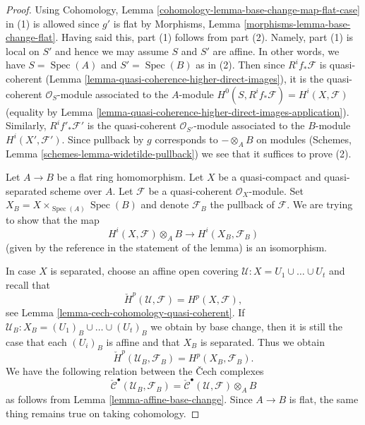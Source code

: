 \documentclass{stacks-project}
\theoremstyle{plain}
\theoremstyle{definition}
\theoremstyle{remark}
\numberwithin{equation}{subsection}
\def\Spec{\mathop{\mathrm{Spec}}}
\begin{document}
\begin{proof}
Using Cohomology, Lemma \ref{cohomology-lemma-base-change-map-flat-case} in (1)
is allowed since $g'$ is flat by
Morphisms, Lemma \ref{morphisms-lemma-base-change-flat}.
Having said this, part (1) follows from part (2). Namely,
part (1) is local on $S'$ and hence we may assume $S$
and $S'$ are affine. In other words, we have $S = \Spec(A)$
and $S' = \Spec(B)$ as in (2).
Then since $R^if_*\mathcal{F}$ is quasi-coherent
(Lemma \ref{lemma-quasi-coherence-higher-direct-images}),
it is the quasi-coherent $\mathcal{O}_S$-module associated to the
$A$-module $H^0(S, R^if_*\mathcal{F}) = H^i(X, \mathcal{F})$
(equality by
Lemma \ref{lemma-quasi-coherence-higher-direct-images-application}).
Similarly, $R^if'_*\mathcal{F}'$ is the quasi-coherent
$\mathcal{O}_{S'}$-module associated to the $B$-module
$H^i(X', \mathcal{F}')$. Since pullback by $g$ corresponds
to $- \otimes_A B$ on modules
(Schemes, Lemma \ref{schemes-lemma-widetilde-pullback})
we see that it suffices to prove (2).

\medskip\noindent
Let $A \to B$ be a flat ring homomorphism.
Let $X$ be a quasi-compact and quasi-separated scheme over $A$.
Let $\mathcal{F}$ be a quasi-coherent $\mathcal{O}_X$-module.
Set $X_B = X \times_{\Spec(A)} \Spec(B)$ and denote
$\mathcal{F}_B$ the pullback of $\mathcal{F}$.
We are trying to show that the map
$$
H^i(X, \mathcal{F}) \otimes_A B \longrightarrow H^i(X_B, \mathcal{F}_B)
$$
(given by the reference in the statement of the lemma)
is an isomorphism.

\medskip\noindent
In case $X$ is separated, choose an affine open covering
$\mathcal{U} : X = U_1 \cup \ldots \cup U_t$ and recall that
$$
\check{H}^p(\mathcal{U}, \mathcal{F}) = H^p(X, \mathcal{F}),
$$
see
Lemma \ref{lemma-cech-cohomology-quasi-coherent}.
If $\mathcal{U}_B : X_B = (U_1)_B \cup \ldots \cup (U_t)_B$ we obtain
by base change, then it is still the case that each $(U_i)_B$ is affine
and that $X_B$ is separated. Thus we obtain
$$
\check{H}^p(\mathcal{U}_B, \mathcal{F}_B) = H^p(X_B, \mathcal{F}_B).
$$
We have the following relation between the {\v C}ech complexes
$$
\check{\mathcal{C}}^\bullet(\mathcal{U}_B, \mathcal{F}_B) =
\check{\mathcal{C}}^\bullet(\mathcal{U}, \mathcal{F}) \otimes_A B
$$
as follows from
Lemma \ref{lemma-affine-base-change}.
Since $A \to B$ is flat, the same thing remains true on taking cohomology.


\end{proof}
\end{document}

